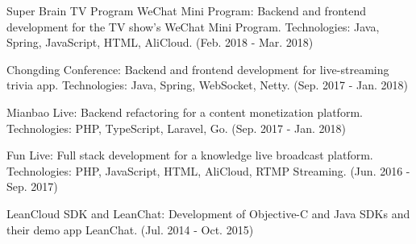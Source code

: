 \begin{cventries}
{\begin{cvitems}
        \item {Super Brain TV Program WeChat Mini Program: Backend and frontend development for the TV show's WeChat Mini Program. Technologies: Java, Spring, JavaScript, HTML, AliCloud. (Feb. 2018 - Mar. 2018)}
        \item {Chongding Conference: Backend and frontend development for live-streaming trivia app. Technologies: Java, Spring, WebSocket, Netty. (Sep. 2017 - Jan. 2018)}
        \item {Mianbao Live: Backend refactoring for a content monetization platform. Technologies: PHP, TypeScript, Laravel, Go. (Sep. 2017 - Jan. 2018)}
        \item {Fun Live: Full stack development for a knowledge live broadcast platform. Technologies: PHP, JavaScript, HTML, AliCloud, RTMP Streaming. (Jun. 2016 - Sep. 2017)}
        \item {LeanCloud SDK and LeanChat: Development of Objective-C and Java SDKs and their demo app LeanChat. (Jul. 2014 - Oct. 2015)}
      \end{cvitems}
    }

\end{cventries}
